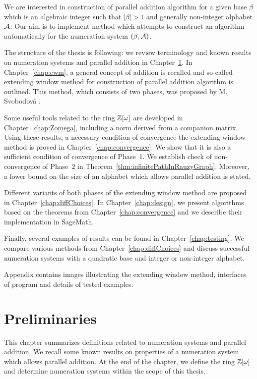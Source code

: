 \documentclass[11pt,a4paper]{report}	%
\theoremstyle{definition}
\begin{document}
We are interested in construction of parallel addition algorithm for a given base $\beta$ which is an algebraic integer such that $|\beta|>1$ and generally non-integer alphabet $\mathcal{A}$. Our aim is to implement method which attempts to construct an algorithm automatically for the numeration system $(\beta,\mathcal{A})$. 

The structure of the thesis is following: we review terminology and known results on numeration systems and parallel addition in Chapter~\ref{chap:preliminaries}. In Chapter~\ref{chap:ewm}, a general concept of addition is recalled and so-called extending window method for construction of parallel addition algorithm is outlined. This method, which consists of two phases, was proposed by M. Svobodov\'a \cite{milena}. 

Some useful tools related to the ring $\mathbb{Z}[\omega]$ are developed in Chapter~\ref{chap:Zomega}, including a norm derived from a companion matrix. Using these results, a necessary condition of convergence the extending window method is proved in Chapter~\ref{chap:convergence}. We show that it is also a sufficient condition of convergence of Phase~1. We establish check of non-convergence of Phase~2 in Theorem~\ref{thm:infinitePathInRauzyGraph}. Moreover, a lower bound on the size of an alphabet which allows parallel addition is stated.

Different variants of both phases of the extending window method are proposed in Chapter~\ref{chap:diffChoices}. In Chapter~\ref{chap:design}, we present algorithms based on the theorems from Chapter~\ref{chap:convergence} and we describe their implementation in SageMath.

Finally, several examples of results can be found in Chapter~\ref{chap:testing}. We compare various methods from Chapter~\ref{chap:diffChoices} and discuss successful numeration systems with a quadratic base and integer or non-integer alphabet. 

Appendix contains images illustrating the extending window method, interfaces of program and details of tested examples.

\chapter{Preliminaries}
\label{chap:preliminaries}
This chapter summarizes definitions related to numeration systems and parallel addition. We recall some known results on properties of a numeration system which allows parallel addition. At the end of the chapter, we define the ring $\mathbb{Z}[\omega]$ and determine numeration systems within the scope of this thesis.
	
\end{document}
